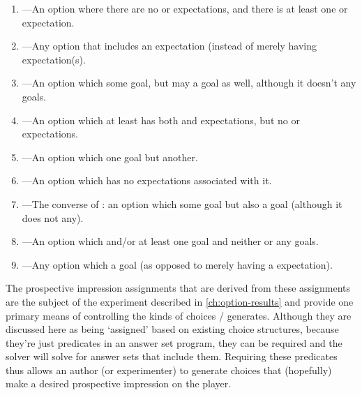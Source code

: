 \begin{enumerate}[leftmargin=1.4em]
\begin{enumerate}
  \item {}---An option where there are no  or  expectations, and there is at least one  or  expectation.
  \item {}---Any  option that includes an  expectation (instead of merely having  expectation(s).
  \item {}---An option which  some goal, but may  a goal as well, although it doesn't  any goals.
  \item {}---An option which at least has both  and  expectations, but no  or  expectations.
  \item {}---An option which  one goal but  another. 
  \item {}---An option which has no expectations associated with it.
  \item {}---The converse of : an option which  some goal but also  a goal (although it does not  any). 
  \item {}---An option which  and/or  at least one goal and neither  or  any goals.
  \item {}---Any  option which  a goal (as opposed to merely having a  expectation). 
\end{enumerate}



The  prospective impression assignments that are derived from these  assignments are the subject of the experiment described in \cref{ch:option-results} and provide one primary means of controlling the kinds of choices \dunyazad/ generates.
%
Although they are discussed here as being `assigned' based on existing choice structures, because they're just predicates in an answer set program, they can be required and the solver will solve for answer sets that include them.
%
Requiring these  predicates thus allows an author (or experimenter) to generate choices that (hopefully) make a desired prospective impression on the player.


\end{enumerate}
